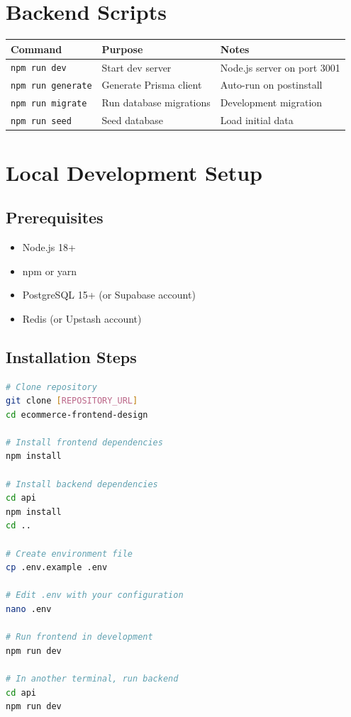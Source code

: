 \documentclass[12pt,a4paper]{report}
\begin{document}
\section{Backend Scripts}

\begin{longtable}{|p{2.5cm}|p{3cm}|p{4cm}|}
\hline
\textbf{Command} & \textbf{Purpose} & \textbf{Notes} \\
\hline
\texttt{npm run dev} & Start dev server & Node.js server on port 3001 \\
\hline
\texttt{npm run generate} & Generate Prisma client & Auto-run on postinstall \\
\hline
\texttt{npm run migrate} & Run database migrations & Development migration \\
\hline
\texttt{npm run seed} & Seed database & Load initial data \\
\hline
\end{longtable}

\section{Local Development Setup}

\subsection{Prerequisites}

\begin{itemize}
    \item Node.js 18+
    \item npm or yarn
    \item PostgreSQL 15+ (or Supabase account)
    \item Redis (or Upstash account)
\end{itemize}

\subsection{Installation Steps}

\begin{lstlisting}[language=bash, caption=Setup Instructions]
# Clone repository
git clone [REPOSITORY_URL]
cd ecommerce-frontend-design

# Install frontend dependencies
npm install

# Install backend dependencies
cd api
npm install
cd ..

# Create environment file
cp .env.example .env

# Edit .env with your configuration
nano .env

# Run frontend in development
npm run dev

# In another terminal, run backend
cd api
npm run dev
\end{lstlisting}
\end{document}
